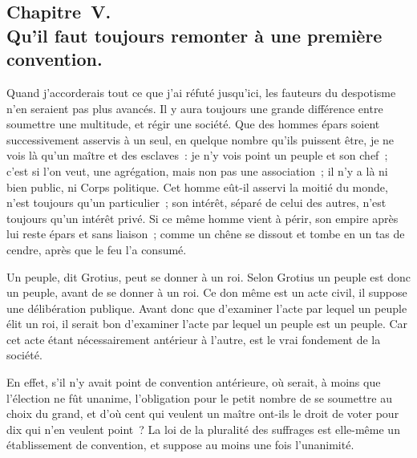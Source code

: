 \documentclass[french,twoside]{book} %
\begin{document}
\subsection[{Chapitre V. Qu’il faut toujours remonter à une première convention.}]{Chapitre V. \\
Qu’il faut toujours remonter à une première convention.}
\noindent Quand j’accorderais tout ce que j’ai réfuté jusqu’ici, les fauteurs du despotisme n’en seraient pas plus avancés. Il y aura toujours une grande différence entre soumettre une multitude, et régir une société. Que des hommes épars soient successivement asservis à un seul, en quelque nombre qu’ils puissent être, je ne vois là qu’un maître et des esclaves : je n’y vois point un peuple et son chef ; c’est si l’on veut, une agrégation, mais non pas une association ; il n’y a là ni bien public, ni Corps politique. Cet homme eût-il asservi la moitié du monde, n’est toujours qu’un particulier ; son intérêt, séparé de celui des autres, n’est toujours qu’un intérêt privé. Si ce même homme vient à périr, son empire après lui reste épars et sans liaison ; comme un chêne se dissout et tombe en un tas de cendre, après que le feu l’a consumé.\par
Un peuple, dit Grotius, peut se donner à un roi. Selon Grotius un peuple est donc un peuple, avant de se donner à un roi. Ce don même est un acte civil, il suppose une délibération publique. Avant donc que d’examiner l’acte par lequel un peuple élit un roi, il serait bon d’examiner l’acte par lequel un peuple est un peuple. Car cet acte étant nécessairement antérieur à l’autre, est le vrai fondement de la société.\par
En effet, s’il n’y avait point de convention antérieure, où serait, à moins que l’élection ne fût unanime, l’obligation pour le petit nombre de se soumettre au choix du grand, et d’où cent qui veulent un maître ont-ils le droit de voter pour dix qui n’en veulent point ? La loi de la pluralité des suffrages est elle-même un établissement de convention, et suppose au moins une fois l’unanimité.
\end{document}
